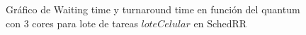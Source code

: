 \begin{figure}[H]
\hfill
{}
\hfill
{}
\hfill
\caption{Gráfico de Waiting time y turnaround time en función del quantum con 3 cores para lote de tareas $loteCelular$ en SchedRR}
\end{figure}

